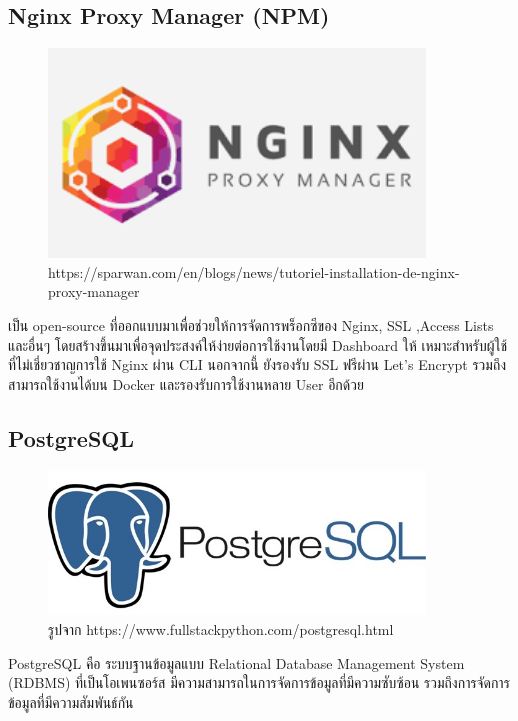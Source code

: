 \subsection{Nginx Proxy Manager (NPM)}
\begin{figure}[H]
  \centering
  \includegraphics[width=100mm, keepaspectratio ]{pictures/npm.png}
  \caption[Nginx Proxy Manager]{https://sparwan.com/en/blogs/news/tutoriel-installation-de-nginx-proxy-manager}
\end{figure}
\hspace{1.27cm}เป็น open-source ที่ออกแบบมาเพื่อช่วยให้การจัดการพร็อกซีของ Nginx, SSL ,Access Lists และอื่นๆ โดยสร้างขึ้นมาเพื่อจุดประสงค์ให้ง่ายต่อการใช้งานโดยมี Dashboard ให้ เหมาะสำหรับผู้ใช้ที่ไม่เชี่ยวชาญการใช้ Nginx ผ่าน CLI นอกจากนี้ ยังรองรับ SSL ฟรีผ่าน Let's Encrypt รวมถึงสามารถใช้งานได้บน Docker และรองรับการใช้งานหลาย User อีกด้วย
\subsection{PostgreSQL}
\begin{figure}[H]
  \centering
  \includegraphics[width=100mm, keepaspectratio ]{pictures/postgres.png}
  \caption[PostgreSQL]{รูปจาก https://www.fullstackpython.com/postgresql.html}
  \label{fig:postgresql}
\end{figure}
\hspace{1.27cm}PostgreSQL คือ ระบบฐานข้อมูลแบบ Relational Database Management System (RDBMS) ที่เป็นโอเพนซอร์ส มีความสามารถในการจัดการข้อมูลที่มีความซับซ้อน รวมถึงการจัดการข้อมูลที่มีความสัมพันธ์กัน 
